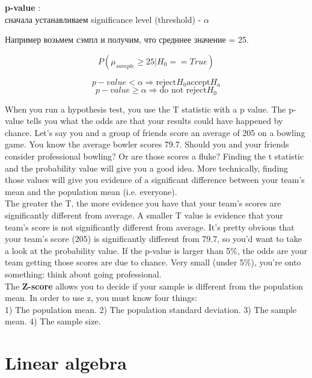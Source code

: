 \documentclass{book}
\begin{document}
\textbf{p-value} :\\
сначала устанавливаем significance level (threshold) - $\alpha$

Например возьмем сэмпл и получим, что средннее значение = 25. 

$$P(\mu_{sample} \geq 25 | H_0 == True)$$

$$p-value < \alpha \Longrightarrow \text{reject} H_0 \text{accept} H_a$$
$$p-value \geq \alpha \Longrightarrow \text{do not reject} H_0$$

When you run a hypothesis test, you use the T statistic with a p value. The p-value tells you what the odds are that your results could have happened by chance. Let’s say you and a group of friends score an average of 205 on a bowling game. You know the average bowler scores 79.7. Should you and your friends consider professional bowling? Or are those scores a fluke? Finding the t statistic and the probability value will give you a good idea. More technically, finding those values will give you evidence of a significant difference between your team’s mean and the population mean (i.e. everyone).\\

The greater the T, the more evidence you have that your team’s scores are significantly different from average. A smaller T value is evidence that your team’s score is not significantly different from average. It’s pretty obvious that your team’s score (205) is significantly different from 79.7, so you’d want to take a look at the probability value. If the p-value is larger than 5\%, the odds are your team getting those scores are due to chance. Very small (under 5\%), you’re onto something: think about going professional.\\

The \textbf{Z-score}  allows you to decide if your sample is different from the population mean. In order to use z, you must know four things:\\

1) The population mean.
2) The population standard deviation.
3) The sample mean.
4) The sample size.


\chapter{Linear algebra}
\end{document}
